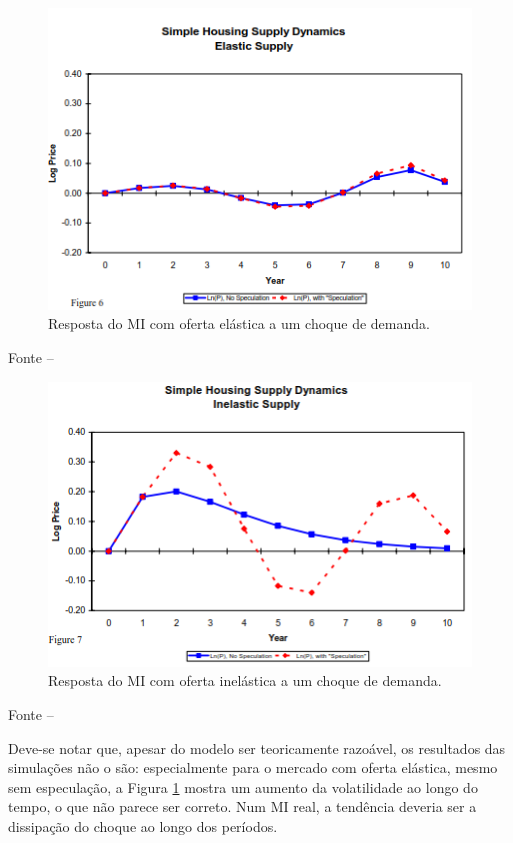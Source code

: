 \documentclass[
	12pt,				%
	oneside,			%
	a4paper,			%
	chapter=TITLE,		%
	section=TITLE,		%
	english,			%
	brazil				%
	]{abntex2}
\newcommand{\bcenter}{\begin{center}}
\newcommand{\ecenter}{\end{center}}
\begin{document}
\begin{refsection}
\begin{figure}[H]
{\centering \includegraphics[width=0.7\linewidth]{images/TheRole_1} 

}

\caption{Resposta do \gls{MI} com oferta elástica a um choque de demanda.}\label{fig:TheRole1}
\end{figure}
\bcenter

\small Fonte -- \textcite[p.~24]{Malpezzi2002TheRO}
\ecenter
\begin{figure}[H]

{\centering \includegraphics[width=0.7\linewidth]{images/TheRole_2} 

}

\caption{Resposta do \gls{MI} com oferta inelástica a um choque de demanda.}\label{fig:TheRole2}
\end{figure}
\bcenter

\small Fonte -- \textcite[p.~24]{Malpezzi2002TheRO}
\ecenter

Deve-se notar que, apesar do modelo ser teoricamente razoável, os resultados das
simulações não o são: especialmente para o mercado com oferta elástica, mesmo
sem especulação, a Figura \ref{fig:TheRole1} mostra um aumento da volatilidade
ao longo do tempo, o que não parece ser correto. Num \gls{MI} real, a tendência
deveria ser a dissipação do choque ao longo dos períodos.


\end{refsection}
\end{document}
